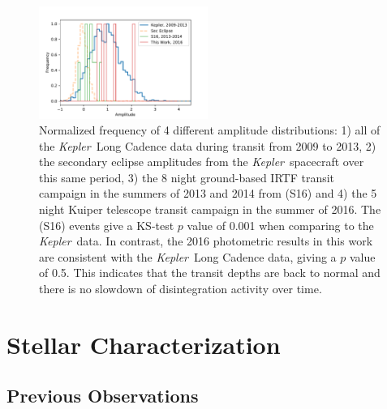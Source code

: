 \documentclass[preprint,trackchanges]{aastex61}
\newcommand{\kepler}{{\it Kepler}}
\begin{document}
\begin{figure}[!hbtp]
\begin{centering}
\includegraphics[width=0.49\textwidth]{amp_distributions_comparison.pdf}
\caption{Normalized frequency of 4 different amplitude distributions: 1) all of the \kepler\ Long Cadence data during transit from 2009 to 2013, 2) the secondary eclipse amplitudes from the \kepler\ spacecraft over this same period, 3) the 8 night ground-based IRTF transit campaign in the summers of 2013 and 2014 from \citet{schlawin2016kic1255} (S16) and 4) the 5 night Kuiper telescope transit campaign in the summer of 2016.
The \citet{schlawin2016kic1255} (S16) events give a KS-test $p$ value of 0.001 when comparing to the \kepler\ data.
In contrast, the 2016 photometric results in this work are consistent with the \kepler\ Long Cadence data, giving a  $p$ value of 0.5.
This indicates that the transit depths are back to normal and there is no slowdown of disintegration activity over time.}\label{fig:histoPhot}
\end{centering}
\end{figure}

\section{Stellar Characterization}\label{sec:stellarCharacterization}
\subsection{Previous Observations}
\end{document}
